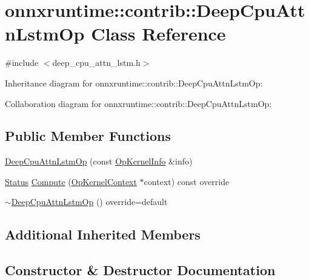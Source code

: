\hypertarget{classonnxruntime_1_1contrib_1_1DeepCpuAttnLstmOp}{}\section{onnxruntime\+:\+:contrib\+:\+:Deep\+Cpu\+Attn\+Lstm\+Op Class Reference}
\label{classonnxruntime_1_1contrib_1_1DeepCpuAttnLstmOp}


{\ttfamily \#include $<$deep\+\_\+cpu\+\_\+attn\+\_\+lstm.\+h$>$}



Inheritance diagram for onnxruntime\+:\+:contrib\+:\+:Deep\+Cpu\+Attn\+Lstm\+Op\+:


Collaboration diagram for onnxruntime\+:\+:contrib\+:\+:Deep\+Cpu\+Attn\+Lstm\+Op\+:
\subsection*{Public Member Functions}
\begin{DoxyCompactItemize}
\item 
\mbox{\hyperlink{classonnxruntime_1_1contrib_1_1DeepCpuAttnLstmOp_a01095bd90d648f585344c742d4f412b5}{Deep\+Cpu\+Attn\+Lstm\+Op}} (const \mbox{\hyperlink{classonnxruntime_1_1OpKernelInfo}{Op\+Kernel\+Info}} \&info)
\item 
\mbox{\hyperlink{classonnxruntime_1_1common_1_1Status}{Status}} \mbox{\hyperlink{classonnxruntime_1_1contrib_1_1DeepCpuAttnLstmOp_aa144694acfe2d731d3897cd9254804b5}{Compute}} (\mbox{\hyperlink{classonnxruntime_1_1OpKernelContext}{Op\+Kernel\+Context}} $\ast$context) const override
\item 
\mbox{\hyperlink{classonnxruntime_1_1contrib_1_1DeepCpuAttnLstmOp_ab42494c05500f79a9e51658dc67c20fb}{$\sim$\+Deep\+Cpu\+Attn\+Lstm\+Op}} () override=default
\end{DoxyCompactItemize}
\subsection*{Additional Inherited Members}


\subsection{Constructor \& Destructor Documentation}
\mbox{\label{classonnxruntime_1_1contrib_1_1DeepCpuAttnLstmOp_a01095bd90d648f585344c742d4f412b5}} 
